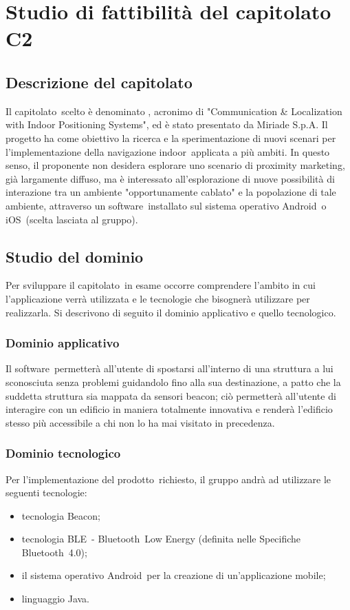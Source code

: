 \documentclass[../StudioDiFattibilita.tex]{subfiles}
\begin{document}
\section{Studio di fattibilità del capitolato C2}
	\subsection{Descrizione del capitolato}
	Il capitolato\g\ scelto è denominato \progetto, acronimo di "Communication \& Localization with Indoor Positioning Systems", ed è stato presentato da Miriade S.p.A.
	Il progetto ha come obiettivo la ricerca e la sperimentazione di nuovi scenari per l'implementazione della navigazione indoor\g\ applicata a più ambiti.
	In questo senso, il proponente non desidera esplorare uno scenario di proximity marketing\g, già largamente diffuso, ma è interessato all'esplorazione di nuove possibilità di interazione tra un ambiente "opportunamente cablato" e la popolazione di tale ambiente, attraverso un software\g\ installato sul sistema operativo Android\g\ o iOS\g\ (scelta lasciata al gruppo).
	\subsection{Studio del dominio}
	Per sviluppare il capitolato\g\ in esame occorre comprendere l'ambito in cui l'applicazione verrà utilizzata e le tecnologie che bisognerà utilizzare per realizzarla. Si descrivono di seguito il dominio applicativo e quello tecnologico.
		\subsubsection{Dominio applicativo}
		Il software\g\ permetterà all'utente di spostarsi all'interno di una struttura a lui sconosciuta senza problemi guidandolo fino alla sua destinazione, a patto che la suddetta struttura sia mappata da sensori beacon\g; ciò permetterà all'utente di interagire con un edificio in maniera totalmente innovativa e renderà l'edificio stesso più accessibile a chi non lo ha mai visitato in precedenza.
		\subsubsection{Dominio tecnologico}
		Per l'implementazione del prodotto\g\ richiesto, il gruppo andrà ad utilizzare le seguenti tecnologie:
			\begin{itemize}
				\item tecnologia Beacon\g;
				\item tecnologia BLE\g\ - Bluetooth\g\ Low Energy (definita nelle Specifiche Bluetooth\g\ 
4.0);
				\item il sistema operativo Android\g\ per la creazione di un'applicazione mobile;
				\item linguaggio Java\g.
			\end{itemize}
\end{document}
